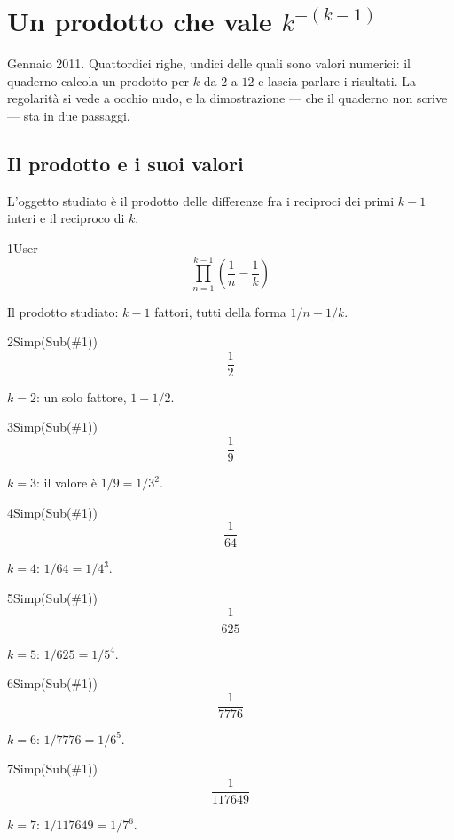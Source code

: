 \chapter{Un prodotto che vale $k^{-(k-1)}$}
\label{cap:fattorazionale}

Gennaio 2011. Quattordici righe, undici delle quali sono valori numerici: il quaderno calcola un prodotto per $k$ da $2$ a $12$ e lascia parlare i risultati. La regolarità si vede a occhio nudo, e la dimostrazione — che il quaderno non scrive — sta in due passaggi.

\section{Il prodotto e i suoi valori}

L'oggetto studiato è il prodotto delle differenze fra i reciproci dei primi $k-1$ interi e il reciproco di $k$.

\begin{espr}{1}{User}{}
\[
\prod_{n=1}^{k - 1} \left(\frac{1}{n} - \frac{1}{k}\right)
\]
\end{espr}
Il prodotto studiato: $k-1$ fattori, tutti della forma $1/n-1/k$.

\begin{espr}{2}{Simp(Sub(\#1))}{}
\[
\frac{1}{2}
\]
\end{espr}
$k=2$: un solo fattore, $1-1/2$.

\begin{espr}{3}{Simp(Sub(\#1))}{}
\[
\frac{1}{9}
\]
\end{espr}
$k=3$: il valore è $1/9=1/3^2$.

\begin{espr}{4}{Simp(Sub(\#1))}{}
\[
\frac{1}{64}
\]
\end{espr}
$k=4$: $1/64=1/4^3$.

\begin{espr}{5}{Simp(Sub(\#1))}{}
\[
\frac{1}{625}
\]
\end{espr}
$k=5$: $1/625=1/5^4$.

\begin{espr}{6}{Simp(Sub(\#1))}{}
\[
\frac{1}{7776}
\]
\end{espr}
$k=6$: $1/7776=1/6^5$.

\begin{espr}{7}{Simp(Sub(\#1))}{}
\[
\frac{1}{117649}
\]
\end{espr}
$k=7$: $1/117649=1/7^6$.

